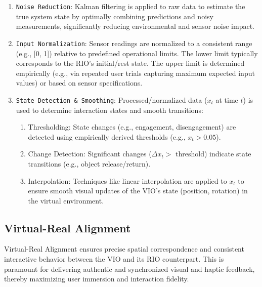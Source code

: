 \begin{enumerate}
  \item \texttt{Noise Reduction}: Kalman filtering is applied to raw data to estimate the true system state by optimally combining predictions and noisy measurements, significantly reducing environmental and sensor noise impact.

  \item \texttt{Input Normalization}: Sensor readings are normalized to a consistent range (e.g., [0, 1]) relative to predefined operational limits. The lower limit typically corresponds to the RIO's initial/rest state. The upper limit is determined empirically (e.g., via repeated user trials capturing maximum expected input values) or based on sensor specifications.

  \item \texttt{State Detection \& Smoothing}: Processed/normalized data ($x_t$ at time $t$) is used to determine interaction states and smooth transitions:
  
  \begin{enumerate}
    \item Thresholding: State changes (e.g., engagement, disengagement) are detected using empirically derived thresholds (e.g., $x_t > 0.05$).

    \item Change Detection: Significant changes ($Δx_t >$ threshold) indicate state transitions (e.g., object release/return).

    \item Interpolation: Techniques like linear interpolation are applied to $x_t$ to ensure smooth visual updates of the VIO's state (position, rotation) in the virtual environment.
  \end{enumerate}

\end{enumerate}

\subsection{Virtual-Real Alignment}
Virtual-Real Alignment ensures precise spatial correspondence and consistent interactive behavior between the VIO and its RIO counterpart. This is paramount for delivering authentic and synchronized visual and haptic feedback, thereby maximizing user immersion and interaction fidelity.

